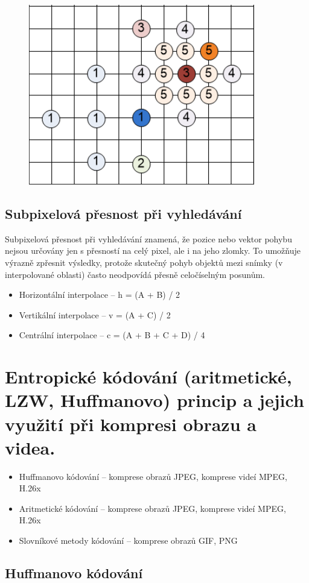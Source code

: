 \begin{figure}[ht]
    \centering
    \includegraphics[width=0.3\linewidth]{MPC-ZMD//images/TSS.png}
\end{figure}
\FloatBarrier

\subsection{Subpixelová přesnost při vyhledávání}

Subpixelová přesnost při vyhledávání znamená, že pozice nebo vektor pohybu nejsou určovány jen s přesností na celý pixel, ale i na jeho zlomky. To umožňuje výrazně zpřesnit výsledky, protože skutečný pohyb objektů mezi snímky (v interpolované oblasti) často neodpovídá přesně celočíselným posunům.

\begin{itemize}
    \item Horizontální interpolace -- h = (A + B) / 2
    \item Vertikální interpolace -- v = (A + C) / 2
    \item Centrální interpolace -- c = (A + B + C + D) / 4
\end{itemize}


\section{Entropické kódování (aritmetické, LZW, Huffmanovo) princip a jejich využití při kompresi obrazu a videa.}

\begin{itemize}
    \item Huffmanovo kódování -- komprese obrazů JPEG, komprese videí MPEG, H.26x
    \item Aritmetické kódování -- komprese obrazů JPEG, komprese videí MPEG, H.26x
    \item Slovníkové metody kódování -- komprese obrazů GIF, PNG
\end{itemize}

\subsection{Huffmanovo kódování}

